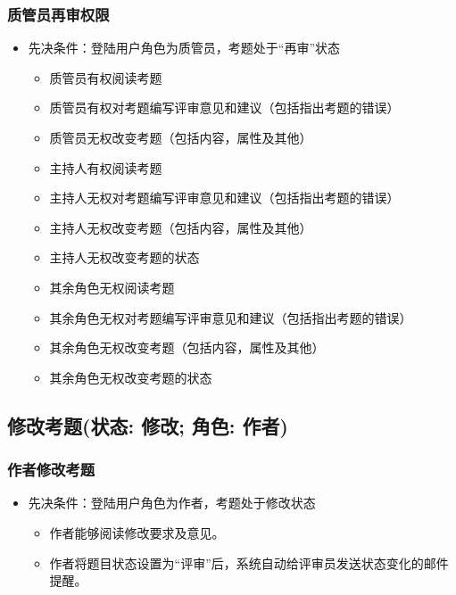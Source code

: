 \documentclass[hyperref, a4paper]{ctexart}
\providecommand{\tightlist}{%
  \setlength{\itemsep}{0pt}\setlength{\parskip}{0pt}}
\begin{document}
\hypertarget{ux8d28ux7ba1ux5458ux518dux5ba1ux6743ux9650}{%
\subsubsection{质管员再审权限}\label{ux8d28ux7ba1ux5458ux518dux5ba1ux6743ux9650}}

\begin{itemize}
\tightlist
\item
  先决条件：登陆用户角色为质管员，考题处于``再审''状态

  \begin{itemize}
  \tightlist
  \item
    质管员有权阅读考题
  \item
    质管员有权对考题编写评审意见和建议（包括指出考题的错误）
  \item
    质管员无权改变考题（包括内容，属性及其他）
  \item
    主持人有权阅读考题
  \item
    主持人无权对考题编写评审意见和建议（包括指出考题的错误）
  \item
    主持人无权改变考题（包括内容，属性及其他）
  \item
    主持人无权改变考题的状态
  \item
    其余角色无权阅读考题
  \item
    其余角色无权对考题编写评审意见和建议（包括指出考题的错误）
  \item
    其余角色无权改变考题（包括内容，属性及其他）
  \item
    其余角色无权改变考题的状态
  \end{itemize}
\end{itemize}

\hypertarget{ux4feeux6539ux8003ux9898ux72b6ux6001-ux4feeux6539-ux89d2ux8272-ux4f5cux8005}{%
\subsection{修改考题(状态: 修改; 角色:
作者)}\label{ux4feeux6539ux8003ux9898ux72b6ux6001-ux4feeux6539-ux89d2ux8272-ux4f5cux8005}}

\hypertarget{ux4f5cux8005ux4feeux6539ux8003ux9898}{%
\subsubsection{作者修改考题}\label{ux4f5cux8005ux4feeux6539ux8003ux9898}}

\begin{itemize}
\tightlist
\item
  先决条件：登陆用户角色为作者，考题处于修改状态

  \begin{itemize}
  \tightlist
  \item
    作者能够阅读修改要求及意见。
  \item
    作者将题目状态设置为``评审''后，系统自动给评审员发送状态变化的邮件提醒。
  \end{itemize}
\end{itemize}
\end{document}
